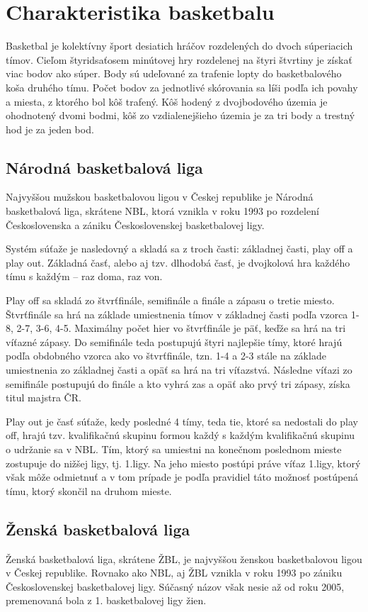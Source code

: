 \documentclass[
  digital, %
  oneside, %
  notable,   %
  lof,     %
  lot,     %
]{fithesis3}
\begin{document}
	\chapter{Charakteristika basketbalu}
	Basketbal je kolektívny šport desiatich hráčov rozdelených do dvoch súperiacich tímov. Cieľom štyridsaťosem minútovej hry rozdelenej na štyri štvrtiny je získať viac bodov ako súper. Body sú udeľované za trafenie lopty do basketbalového koša druhého tímu. Počet bodov za jednotlivé skórovania sa líši podľa ich povahy a miesta, z ktorého bol kôš trafený. Kôš hodený z dvojbodového územia je ohodnotený dvomi bodmi, kôš zo vzdialenejšieho územia je za tri body a trestný hod je za jeden bod.
		\section{Národná basketbalová liga}
		Najvyššou mužskou basketbalovou ligou v Českej republike je Národná basketbalová liga, skrátene NBL, ktorá vznikla v roku 1993 po rozdelení Československa a zániku Československej basketbalovej ligy.
		
		Systém súťaže je nasledovný a skladá sa z troch časti: základnej časti, play off a play out. Základná časť, alebo aj tzv. dlhodobá časť, je dvojkolová hra každého tímu s každým – raz doma, raz von. 
		
		Play off sa skladá zo štvrťfinále, semifinále a finále a zápasu o tretie miesto. Štvrťfinále sa hrá na základe umiestnenia tímov v základnej časti podľa vzorca 1-8, 2-7, 3-6, 4-5. Maximálny počet hier vo štvrťfinále je päť, keďže sa hrá na tri víťazné zápasy. Do semifinále teda postupujú štyri najlepšie tímy, ktoré hrajú podľa obdobného vzorca ako vo štvrťfinále, tzn. 1-4 a 2-3 stále na základe umiestnenia zo základnej časti a opäť sa hrá na tri víťazstvá. Následne víťazi zo semifinále postupujú do finále a kto vyhrá zas a opäť ako prvý tri zápasy, získa titul majstra ČR.
		
		Play out je časť súťaže, kedy posledné 4 tímy, teda tie, ktoré sa nedostali do play off, hrajú tzv. kvalifikačnú skupinu formou každý s každým kvalifikačnú skupinu o udržanie sa v NBL. Tím, ktorý sa umiestni na konečnom poslednom mieste zostupuje do nižšej ligy, tj. 1.ligy. Na jeho miesto postúpi práve víťaz 1.ligy, ktorý však môže odmietnuť a v tom prípade je podľa pravidiel táto možnosť postúpená tímu, ktorý skončil na druhom mieste.
		
		\section{Ženská basketbalová liga}
		Ženská basketbalová liga, skrátene ŽBL, je najvyššou ženskou basketbalovou ligou v Českej republike. Rovnako ako NBL, aj ŽBL vznikla v roku 1993 po zániku Československej basketbalovej ligy. Súčasný názov však nesie až od roku 2005, premenovaná bola z 1. basketbalovej ligy žien.
		
\end{document}
